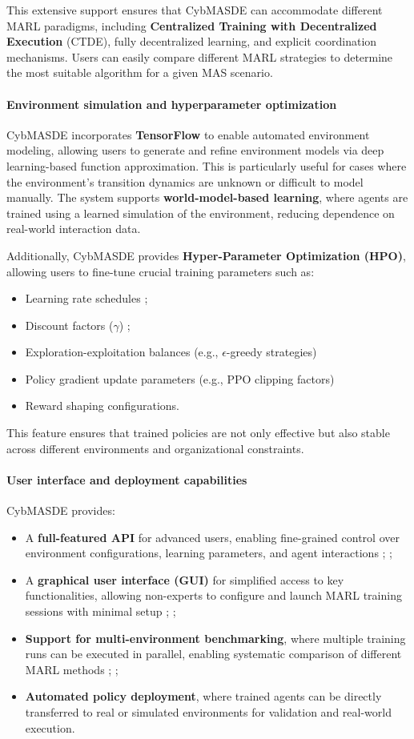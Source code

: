 \documentclass[pdflatex,sn-mathphys-num]{sn-jnl}%
\theoremstyle{thmstyleone}%
\theoremstyle{thmstyletwo}%
\theoremstyle{thmstylethree}%
\begin{document}
This extensive support ensures that CybMASDE can accommodate different MARL paradigms, including \textbf{Centralized Training with Decentralized Execution} (CTDE), fully decentralized learning, and explicit coordination mechanisms. Users can easily compare different MARL strategies to determine the most suitable algorithm for a given MAS scenario.

\paragraph{Environment simulation and hyperparameter optimization} 
CybMASDE incorporates \textbf{TensorFlow} to enable automated environment modeling, allowing users to generate and refine environment models via deep learning-based function approximation. This is particularly useful for cases where the environment's transition dynamics are unknown or difficult to model manually. The system supports \textbf{world-model-based learning}, where agents are trained using a learned simulation of the environment, reducing dependence on real-world interaction data.

Additionally, CybMASDE provides \textbf{Hyper-Parameter Optimization (HPO)}, allowing users to fine-tune crucial training parameters such as:
\begin{itemize}
    \item Learning rate schedules ;
    \item Discount factors ($\gamma$) ;
    \item Exploration-exploitation balances (e.g., $\epsilon$-greedy strategies)
    \item Policy gradient update parameters (e.g., PPO clipping factors)
    \item Reward shaping configurations.
\end{itemize}

This feature ensures that trained policies are not only effective but also stable across different environments and organizational constraints.

\paragraph{User interface and deployment capabilities} 
CybMASDE provides:
\begin{itemize}
    \item A \textbf{full-featured API} for advanced users, enabling fine-grained control over environment configurations, learning parameters, and agent interactions ; ;
    \item A \textbf{graphical user interface (GUI)} for simplified access to key functionalities, allowing non-experts to configure and launch MARL training sessions with minimal setup ; ;
    \item \textbf{Support for multi-environment benchmarking}, where multiple training runs can be executed in parallel, enabling systematic comparison of different MARL methods ; ;
    \item \textbf{Automated policy deployment}, where trained agents can be directly transferred to real or simulated environments for validation and real-world execution.
\end{itemize}
\end{document}
